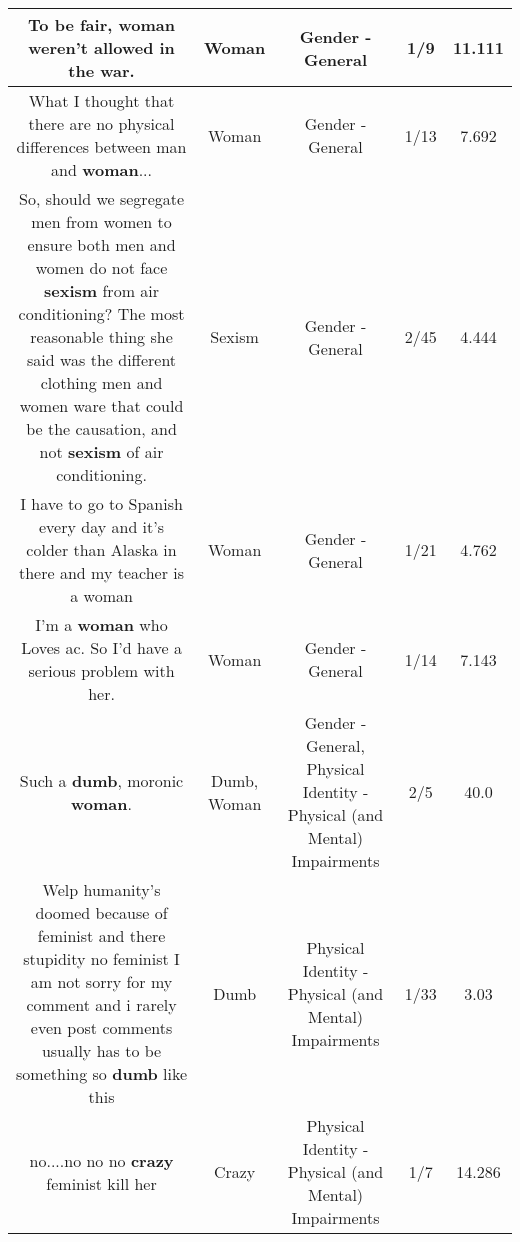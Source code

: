 \documentclass[11pt]{article}
\newlength\mylength
\begin{document}
\begin{center}
\begin{longtable}{|C{.65\mylength}|C{.30\mylength}|C{.12\mylength}|C{.12\mylength}|C{.12\mylength}|}
  \small To be fair, \textbf{woman} weren't allowed in the war.\normalsize   & Woman & Gender - General & 1/9 & 11.111 \\  \hline
  \small What I thought that there are no physical differences between man and \textbf{woman}...\normalsize   & Woman & Gender - General & 1/13 & 7.692 \\  \hline
  \small So, should we segregate men from women to ensure both men and women do not face \textbf{sexism} from air conditioning? The most reasonable thing she said was the different clothing men and women ware that could be the causation, and not \textbf{sexism} of air conditioning.\normalsize   & Sexism & Gender - General & 2/45 & 4.444 \\  \hline
  \small I have to go to Spanish every day and it's colder than Alaska in there and my teacher is a woman\normalsize   & Woman & Gender - General & 1/21 & 4.762 \\  \hline
  \small I'm a \textbf{woman} who Loves ac. So I'd have a serious problem with her.\normalsize   & Woman & Gender - General & 1/14 & 7.143 \\  \hline
  \small Such a \textbf{dumb}, moronic \textbf{woman}.\normalsize   & Dumb, Woman & Gender - General, Physical Identity - Physical (and Mental) Impairments & 2/5 & 40.0 \\  \hline
  \small Welp humanity's doomed because of feminist and there stupidity no feminist I am not sorry for my comment and i rarely even post comments usually has to be something so \textbf{dumb} like this\normalsize   & Dumb & Physical Identity - Physical (and Mental) Impairments & 1/33 & 3.03 \\  \hline
  \small no....no no no \textbf{crazy} feminist kill her\normalsize   & Crazy & Physical Identity - Physical (and Mental) Impairments & 1/7 & 14.286 \\  \hline

\end{longtable}
\end{center}
\end{document}
